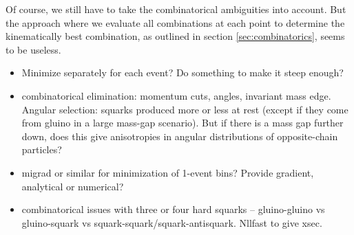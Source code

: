 \documentclass[twoside,english]{uiofysmaster}
\begin{document}
Of course, we still have to take the combinatorical ambiguities into account. But the approach where we evaluate all combinations at each point to determine the kinematically best combination, as outlined in section \ref{sec:combinatorics}, seems to be useless. 






\begin{itemize}
	\item Minimize separately for each event? Do something to make it steep enough?
	\item combinatorical elimination: momentum cuts, angles, invariant mass edge. Angular selection: squarks produced more or less at rest (except if they come from gluino in a large mass-gap scenario). But if there is a mass gap further down, does this give anisotropies in angular distributions of opposite-chain particles?
	\item migrad or similar for minimization of 1-event bins? Provide gradient, analytical or numerical?
	\item combinatorical issues with three or four hard squarks -- gluino-gluino vs gluino-squark vs squark-squark/squark-antisquark. Nllfast to give xsec. 
\end{itemize}




















\end{document}
